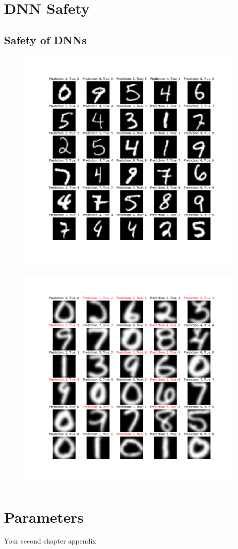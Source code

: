 


    \chapter{DNN Safety}
    \section{Safety of DNNs}
    \label{sec:mnistvusps}
    \begin{figure}
            \centering
            \includegraphics[scale=0.5]{images/mnist.png}
            \caption{}
    \end{figure}
    \begin{figure}
            \centering
            \includegraphics[scale=0.55]{images/usps.png}
            \caption{}
    \end{figure}

    \chapter{Parameters}
    Your second chapter appendix


